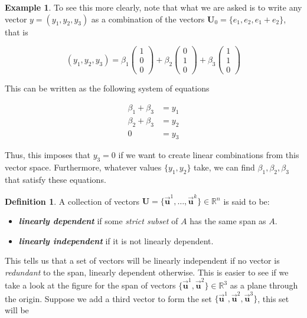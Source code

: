 \documentclass[a4paper,11pt]{article}
\theoremstyle{definition}
\newtheorem{definition}{Definition}
\newtheorem{example}{Example}
\theoremstyle{plain}
\begin{document}
\begin{example}
To see this more clearly, note that what we are asked is to write any
vector \(y = (y_1, y_2, y_3)\) as a combination of the vectors
\(\mathbf{U}_0 = \{e_1, e_2, e_1 + e_2\}\), that is

\[
(y_1, y_2, y_3) = \beta_1 \begin{pmatrix} 1 \\ 0 \\ 0 \end{pmatrix} + \beta_2 \begin{pmatrix} 0 \\ 1 \\ 0 \end{pmatrix} + \beta_3 \begin{pmatrix} 1 \\ 1 \\ 0 \end{pmatrix}
\]

This can be written as the following system of equations

\begin{align*}
\beta_1 + \beta_3 &= y_1 \\
\beta_2 + \beta_3 &= y_2 \\
0 &= y_3
\end{align*}

Thus, this imposes that \(y_3 = 0\) if we want to create linear
combinations from this vector space. Furthermore, whatever values
\(\{y_1, y_2\}\) take, we can find \(\beta_1, \beta_2, \beta_3\) that
satisfy these equations.
\end{example}

\begin{definition}
A collection of vectors \(\mathbf{U} = \{\vec{\mathbf{u}}^1, \ldots, \vec{\mathbf{u}}^k\}\in\mathbb{R}^n\)
is said to be: 

\begin{itemize}
    \item\textbf{\emph{linearly dependent}} if some \emph{strict subset} of \(A\) has the same span as \(A\). 

    \item\textbf{\emph{linearly independent}} if it is not linearly dependent.
\end{itemize}
\end{definition}

This tells us that a set of vectors will be linearly independent if no
vector is \emph{redundant} to the span, linearly dependent otherwise.
This is easier to see if we take a look at the figure for the span of
vectors \(\{\vec{\mathbf{u}}^1, \vec{\mathbf{u}}^2\}\in\mathbb{R}^3\) as
a plane through the origin. Suppose we add a third vector to form the
set \(\{\vec{\mathbf{u}}^1, \vec{\mathbf{u}}^2, \vec{\mathbf{u}}^3\}\),
this set will be 
\end{document}
